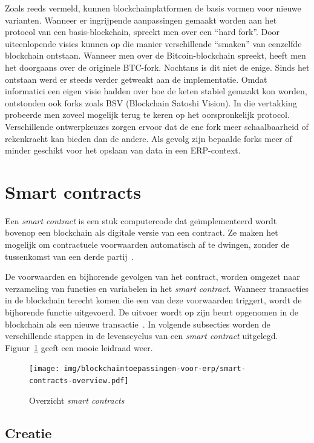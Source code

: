 Zoals reeds vermeld, kunnen blockchainplatformen de basis vormen voor nieuwe varianten. Wanneer er ingrijpende aanpassingen gemaakt worden aan het protocol van een basis-blockchain, spreekt men over een ``hard fork''. Door uiteenlopende visies kunnen op die manier verschillende ``smaken'' van eenzelfde blockchain ontstaan. Wanneer men over de Bitcoin-blockchain spreekt, heeft men het doorgaans over de originele BTC-fork. Nochtans is dit niet de enige. Sinds het ontstaan werd er steeds verder getweakt aan de implementatie. Omdat informatici een eigen visie hadden over hoe de keten stabiel gemaakt kon worden, ontstonden ook forks zoals BSV (Blockchain Satoshi Vision). In die vertakking probeerde men zoveel mogelijk terug te keren op het oorspronkelijk protocol. Verschillende ontwerpkeuzes zorgen ervoor dat de ene fork meer schaalbaarheid of rekenkracht kan bieden dan de andere. Als gevolg zijn bepaalde forks meer of minder geschikt voor het opslaan van data in een ERP-context.

\section{Smart contracts}
\label{sec:smart-contracts}

Een \textit{smart contract} is een stuk computercode dat geïmplementeerd wordt bovenop een blockchain als digitale versie van een contract. Ze maken het mogelijk om contractuele voorwaarden automatisch af te dwingen, zonder de tussenkomst van een derde partij~\autocite{Salem2008}.

De voorwaarden en bijhorende gevolgen van het contract, worden omgezet naar verzameling van functies en variabelen in het \textit{smart contract}. Wanneer transacties in de blockchain terecht komen die een van deze voorwaarden triggert, wordt de bijhorende functie uitgevoerd. De uitvoer wordt op zijn beurt opgenomen in de blockchain als een nieuwe transactie~\autocite{Zheng2019}. In volgende subsecties worden de verschillende stappen in de levenscyclus van een \textit{smart contract} uitgelegd. Figuur~\ref{fig:smart-contracts-overview} geeft een mooie leidraad weer.

\begin{figure}[]
	\centering
	\texttt{[image: img/blockchaintoepassingen-voor-erp/smart-contracts-overview.pdf]}
	\caption{\label{fig:smart-contracts-overview}Overzicht \textit{smart contracts}~\autocite{Zheng2019}}
\end{figure}

\subsection{Creatie}
\label{sub:creatie}

